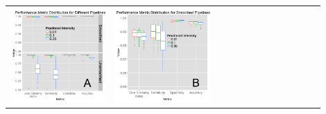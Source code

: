\documentclass[final]{beamer}\usepackage[]{graphicx}\usepackage[]{color}
\begin{document}
\begin{frame}[fragile]
\begin{multicols}{2}
\begin{tabular}{>{\centering}m{0.3\linewidth}>{\centering}m{0.3\linewidth}p{0.3\linewidth}}
\includegraphics[width=\linewidth]{figure/CT_Skull_Stripping_Figure2.png} &
\includegraphics[width=\linewidth]{figure/CT_Skull_Stripping_Figure2b.png} & 

\end{tabular}
\end{multicols}
\end{frame}
\end{document}
